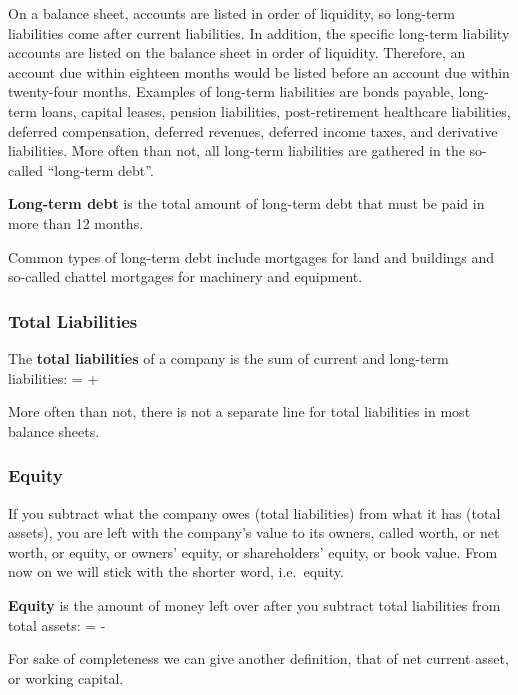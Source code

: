 On a balance sheet, accounts are listed in order of liquidity, so long-term liabilities come after current
liabilities. In addition, the specific long-term liability accounts are listed on the balance sheet in order of
liquidity. Therefore, an account due within eighteen months would be listed before an account due within twenty-four
months. Examples of long-term liabilities are bonds payable, long-term loans, capital leases, pension liabilities,
post-retirement healthcare liabilities, deferred compensation, deferred revenues, deferred income taxes, and
derivative liabilities. \v

More often than not, all long-term liabilities are gathered in the so-called ``long-term debt''.

\textbf{Long-term debt} is the total amount of long-term debt that must be paid in more than 12 months.
\ed

\be
Common types of long-term debt include mortgages for land and buildings and so-called chattel mortgages for machinery
and equipment.
\ee

\subsubsection{Total Liabilities}

The \textbf{total liabilities} of a company is the sum of current and long-term liabilities:
\bse
{} =  + 
\ese
\ed

More often than not, there is not a separate line for total liabilities in most balance sheets.

\subsubsection{Equity}

If you subtract what the company owes (total liabilities) from what it has (total assets), you are left with the
company's value to its owners, called worth, or net worth, or equity, or owners' equity, or shareholders' equity,
or book value. From now on we will stick with the shorter word, i.e.\ equity.

\bd[Equity]
\textbf{Equity} is the amount of money left over after you subtract total liabilities from total assets:
\bse
{} =  - 
\ese
\ed

For sake of completeness we can give another definition, that of net current asset, or working capital.

